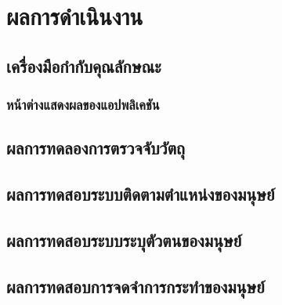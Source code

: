 \chapter{ผลการดำเนินงาน}
\section{เครื่องมือกำกับคุณลักษณะ}
\subsection{หน้าต่างแสดงผลของแอปพลิเคชัน}


\clearpage
\section{ผลการทดลองการตรวจจับวัตถุ}

\clearpage
\section{ผลการทดสอบระบบติดตามตำแหน่งของมนุษย์}

\clearpage
\section{ผลการทดสอบระบบระบุตัวตนของมนุษย์}

\clearpage
\section{ผลการทดสอบการจดจำการกระทำของมนุษย์}
